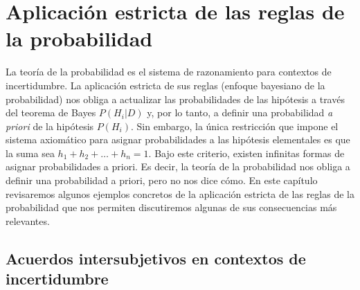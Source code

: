 \documentclass[a4paper,11pt]{book}
\theoremstyle{definition}
\begin{document}
\section{Aplicaci\'on estricta de las reglas de la probabilidad} \label{sec:aplicacion_estricta}


La teor\'ia de la probabilidad es el sistema de razonamiento para contextos de incertidumbre.
%
La aplicaci\'on estricta de sus reglas (enfoque bayesiano de la probabilidad) nos obliga a actualizar las probabilidades de las hip\'otesis a trav\'es del teorema de Bayes $P(H_i|D)$ y, por lo tanto, a definir una probabilidad \emph{a priori} de la hip\'otesis $P(H_i)$.
%
Sin embargo, la \'unica restricci\'on que impone el sistema axiom\'atico para asignar probabilidades a las hip\'otesis elementales es que la suma sea $h_1 + h_2 + \dots + h_n = 1$.
%
Bajo este criterio, existen infinitas formas de asignar probabilidades a priori.
%
Es decir, la teor\'ia de la probabilidad nos obliga a definir una probabilidad a priori, pero no nos dice c\'omo.
%
En este cap\'itulo revisaremos algunos ejemplos concretos de la aplicaci\'on estricta de las reglas de la probabilidad que nos permiten discutiremos algunas de sus consecuencias m\'as relevantes.

\subsection{Acuerdos intersubjetivos en contextos de incertidumbre} \label{sec:acuerdos_intersubjetivos}
\end{document}
